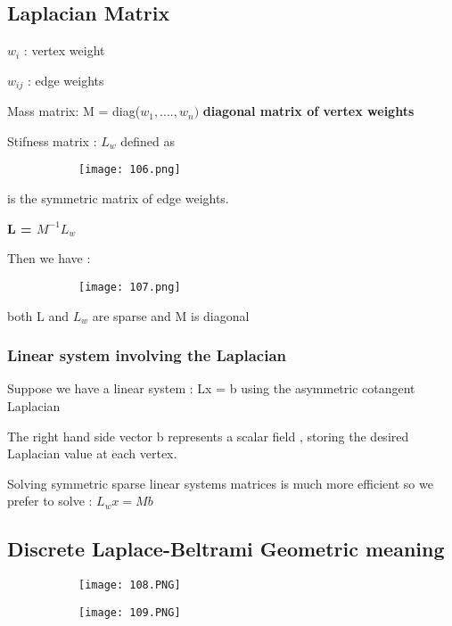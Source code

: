 \documentclass{article}
\begin{document}
\subsection{Laplacian Matrix}

$w_i$ : vertex weight

$w_{ij}$ : edge weights

Mass matrix: M = diag($w_1,....,w_n)$ \textbf{diagonal matrix of vertex weights}

Stifness matrix : $L_w$ defined as 

    \begin{figure}[ht!]
  \centering
  \begin{subfigure}[b]{0.7\linewidth}
    \texttt{[image: 106.png]}
  \end{subfigure}
\end{figure}

is the symmetric matrix of edge weights.

\textbf{L = $M^{-1} L_w$}

Then we have :

    \begin{figure}[ht!]
  \centering
  \begin{subfigure}[b]{0.7\linewidth}
    \texttt{[image: 107.png]}
  \end{subfigure}
\end{figure}

both L and $L_w$ are sparse and M is diagonal

\subsubsection{Linear system involving the Laplacian}

Suppose we have a linear system : Lx = b using the asymmetric cotangent Laplacian

The right hand side vector b represents a scalar field , storing the desired Laplacian value at each vertex.

Solving symmetric sparse linear systems matrices is much more efficient so we prefer to solve : $L_wx = Mb$

\subsection{Discrete Laplace-Beltrami Geometric meaning}




\begin{figure}[ht!]
  \centering
  \begin{subfigure}[b]{0.49\linewidth}
    \texttt{[image: 108.PNG]}
  \end{subfigure}
     \begin{subfigure}[b]{0.49\textwidth}
         \centering
         \texttt{[image: 109.PNG]}
     \end{subfigure}
\end{figure}
\end{document}
